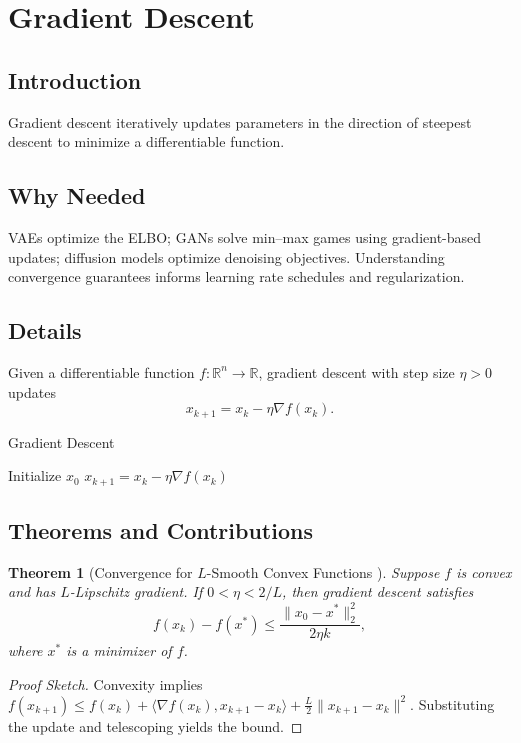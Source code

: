 \documentclass[11pt]{book}
\newtheorem{theorem}{Theorem}[chapter]
\begin{document}
\section{Gradient Descent}
\subsection{Introduction}
Gradient descent iteratively updates parameters in the direction of steepest descent to minimize a differentiable function.

\subsection{Why Needed}
VAEs optimize the ELBO; GANs solve min--max games using gradient-based updates; diffusion models optimize denoising objectives. Understanding convergence guarantees informs learning rate schedules and regularization.

\subsection{Details}
Given a differentiable function $f: \mathbb{R}^n \to \mathbb{R}$, gradient descent with step size $\eta>0$ updates
\begin{equation}
x_{k+1} = x_k - \eta \nabla f(x_k).
\end{equation}

\begin{algorithm}
\caption{Gradient Descent}
\begin{algorithmic}[1]
\STATE Initialize $x_0$
    \STATE $x_{k+1}=x_k-\eta\nabla f(x_k)$
\ENDFOR
\end{algorithmic}
\end{algorithm}

\subsection{Theorems and Contributions}
\begin{theorem}[Convergence for $L$-Smooth Convex Functions \cite{cauchy1847,rockafellar1970}]
Suppose $f$ is convex and has $L$-Lipschitz gradient. If $0<\eta<2/L$, then gradient descent satisfies
\begin{equation}
f(x_k)-f(x^*)\le\frac{\|x_0-x^*\|_2^2}{2\eta k},
\end{equation}
where $x^*$ is a minimizer of $f$.
\end{theorem}
\begin{proof}[Proof Sketch]
Convexity implies $f(x_{k+1})\le f(x_k)+\langle\nabla f(x_k),x_{k+1}-x_k\rangle+\tfrac{L}{2}\|x_{k+1}-x_k\|^2$. Substituting the update and telescoping yields the bound.
\end{proof}
\end{document}

